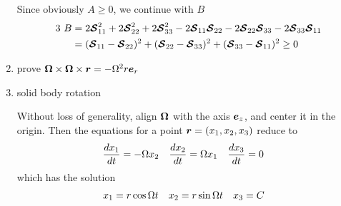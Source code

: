 \begin{enumerate}
  Since obviously $A \geq 0$, we continue with $B$
  \begin{align*}
    3~B &= 
    2 \boldsymbol {\mathcal S}_{11}^2 + 
    2 \boldsymbol {\mathcal S}_{22}^2 + 
    2 \boldsymbol {\mathcal S}_{33}^2 -  
    2 \boldsymbol {\mathcal S}_{11} \boldsymbol {\mathcal S}_{22} -
    2 \boldsymbol {\mathcal S}_{22} \boldsymbol {\mathcal S}_{33} - 
    2 \boldsymbol {\mathcal S}_{33} \boldsymbol {\mathcal S}_{11} \\
    &=(\boldsymbol {\mathcal S}_{11} - \boldsymbol {\mathcal S}_{22})^2 +
      (\boldsymbol {\mathcal S}_{22} - \boldsymbol {\mathcal S}_{33})^2 +
      (\boldsymbol {\mathcal S}_{33} - \boldsymbol {\mathcal S}_{11})^2 \geq 0
  \end{align*}
  
\item prove
  $\boldsymbol {\Omega} \times \boldsymbol {\Omega} \times \boldsymbol {r} = - \Omega^2 r
  \boldsymbol e_{r}$
  
\item solid body rotation 

  Without loss of generality, align $\boldsymbol {\Omega}$ with the axis $\boldsymbol e_{z}$,
  and center it in the origin. Then the equations for a point $\boldsymbol {r} =
  (x_1,x_2,x_3)$ reduce to
  \begin{align*}
    \frac{dx_1}{dt} &= - \Omega x_2 &
    \frac{dx_2}{dt} &= \Omega x_1 &
    \frac{dx_3}{dt} &= 0
  \end{align*}
  which has the solution 
  \begin{align*}
    x_1 &= r \cos {\ensuremath{\Omega}t} &
    x_2 &= r \sin {\ensuremath{\Omega}t} &
    x_3 &= C
  \end{align*}
    
\end{enumerate}
